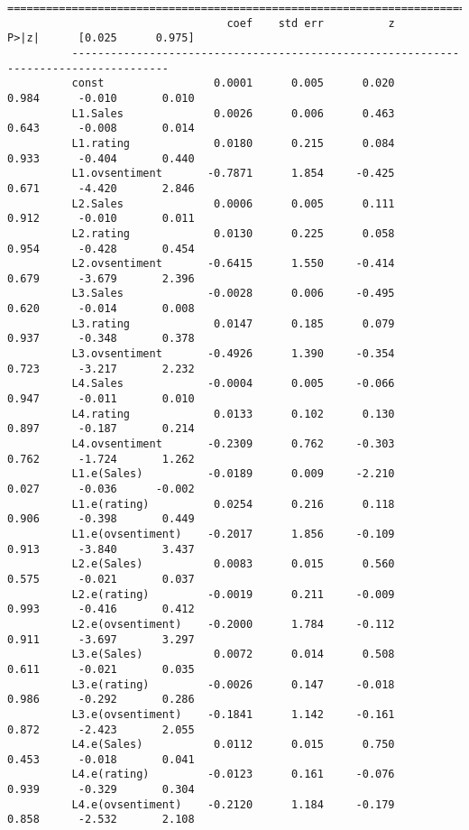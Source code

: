 \documentclass[11pt]{article}
\begin{document}
\begin{Verbatim}[commandchars=\\\{\}]
          =====================================================================================
                                  coef    std err          z      P>|z|      [0.025      0.975]
          -------------------------------------------------------------------------------------
          const                 0.0001      0.005      0.020      0.984      -0.010       0.010
          L1.Sales              0.0026      0.006      0.463      0.643      -0.008       0.014
          L1.rating             0.0180      0.215      0.084      0.933      -0.404       0.440
          L1.ovsentiment       -0.7871      1.854     -0.425      0.671      -4.420       2.846
          L2.Sales              0.0006      0.005      0.111      0.912      -0.010       0.011
          L2.rating             0.0130      0.225      0.058      0.954      -0.428       0.454
          L2.ovsentiment       -0.6415      1.550     -0.414      0.679      -3.679       2.396
          L3.Sales             -0.0028      0.006     -0.495      0.620      -0.014       0.008
          L3.rating             0.0147      0.185      0.079      0.937      -0.348       0.378
          L3.ovsentiment       -0.4926      1.390     -0.354      0.723      -3.217       2.232
          L4.Sales             -0.0004      0.005     -0.066      0.947      -0.011       0.010
          L4.rating             0.0133      0.102      0.130      0.897      -0.187       0.214
          L4.ovsentiment       -0.2309      0.762     -0.303      0.762      -1.724       1.262
          L1.e(Sales)          -0.0189      0.009     -2.210      0.027      -0.036      -0.002
          L1.e(rating)          0.0254      0.216      0.118      0.906      -0.398       0.449
          L1.e(ovsentiment)    -0.2017      1.856     -0.109      0.913      -3.840       3.437
          L2.e(Sales)           0.0083      0.015      0.560      0.575      -0.021       0.037
          L2.e(rating)         -0.0019      0.211     -0.009      0.993      -0.416       0.412
          L2.e(ovsentiment)    -0.2000      1.784     -0.112      0.911      -3.697       3.297
          L3.e(Sales)           0.0072      0.014      0.508      0.611      -0.021       0.035
          L3.e(rating)         -0.0026      0.147     -0.018      0.986      -0.292       0.286
          L3.e(ovsentiment)    -0.1841      1.142     -0.161      0.872      -2.423       2.055
          L4.e(Sales)           0.0112      0.015      0.750      0.453      -0.018       0.041
          L4.e(rating)         -0.0123      0.161     -0.076      0.939      -0.329       0.304
          L4.e(ovsentiment)    -0.2120      1.184     -0.179      0.858      -2.532       2.108

\end{Verbatim}
\end{document}

